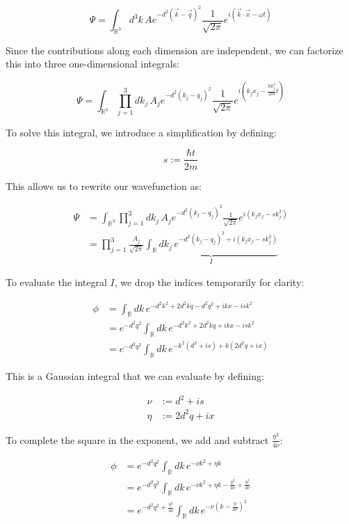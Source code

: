 \documentclass[italian]{HKNdocument}
\begin{document}
\begin{equation}
\Psi = \int_{\mathbb{R}^3}d^3k\,Ae^{-d^2(\vec{k}-\vec{q})^2}\frac{1}{\sqrt{2\pi}}e^{i(\vec{k}\cdot\vec{x}-\omega t)}
\end{equation}

Since the contributions along each dimension are independent, we can factorize this into three one-dimensional integrals:

\begin{equation}
\Psi = \int_{\mathbb{R}^3}\prod_{j=1}^3 dk_j\,A_je^{-d^2(k_j-q_j)^2}\frac{1}{\sqrt{2\pi}}e^{i(k_jx_j-\frac{\hbar k_j^2}{2m}t)}
\end{equation}


To solve this integral, we introduce a simplification by defining:

\begin{equation}
s := \frac{\hbar t}{2m}
\end{equation}

This allows us to rewrite our wavefunction as:

\begin{align}
\Psi &= \int_{\mathbb{R}^3}\prod_{j=1}^3dk_j\,A_je^{-d^2(k_j-q_j)^2}\frac{1}{\sqrt{2\pi}}e^{i(k_jx_j-sk_j^2)} \\
&= \prod_{j=1}^3\frac{A_j}{\sqrt{2\pi}}\underbrace{\int_{\mathbb{R}}dk_j\,e^{-d^2(k_j-q_j)^2+i(k_jx_j-sk_j^2)}}_{I}
\end{align}

To evaluate the integral $I$, we drop the indices temporarily for clarity:

\begin{align}
\phi &= \int_{\mathbb{R}}dk\,e^{-d^2k^2+2d^2kq-d^2q^2+ikx-isk^2} \\
&= e^{-d^2q^2}\int_{\mathbb{R}}dk\,e^{-d^2k^2+2d^2kq+ikx-isk^2}  \\
&= e^{-d^2q^2}\int_{\mathbb{R}}dk\,e^{-k^2(d^2+is)+k(2d^2q+ix)}
\end{align}

This is a Gaussian integral that we can evaluate by defining:

\begin{align}
\nu &:= d^2+is \\
\eta &:= 2d^2q+ix
\end{align}

To complete the square in the exponent, we add and subtract $\frac{\eta^2}{4\nu}$:

\begin{align}
\phi &= e^{-d^2q^2}\int_{\mathbb{R}}dk\,e^{-\nu k^2+\eta k} \\
&= e^{-d^2q^2}\int_{\mathbb{R}}dk\,e^{-\nu k^2+\eta k-\frac{\eta^2}{4\nu}+\frac{\eta^2}{4\nu}}  \\
&= e^{-d^2q^2+\frac{\eta^2}{4\nu}}\int_{\mathbb{R}}dk\,e^{-\nu\left(k-\frac{\eta}{2\nu}\right)^2}
\end{align}
\end{document}
